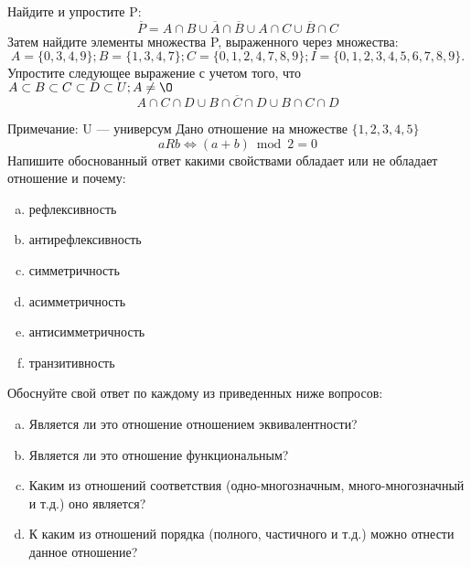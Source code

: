 \documentclass[10pt]{exam}
\begin{document}
\begin{questions}
\question
Найдите и упростите P:
\begin{equation*}
\overline{P} = A \cap B \cup \overline{A} \cap \overline{B} \cup A \cap C \cup \overline{B} \cap C
\end{equation*}
Затем найдите элементы множества P, выраженного через множества:
\begin{equation*}
A = \{0, 3, 4, 9\}; 
B = \{1, 3, 4, 7\};
C = \{0, 1, 2, 4, 7, 8, 9\};
I = \{0, 1, 2, 3, 4, 5, 6, 7, 8, 9\}.
\end{equation*}\question
Упростите следующее выражение с учетом того, что $A\subset B \subset C \subset D \subset U; A \neq \O$
\begin{equation*}
A \cap C  \cap D \cup B \cap \overline{C} \cap D \cup B \cap C \cap D
\end{equation*}

Примечание: U — универсум\question
Дано отношение на множестве $\{1, 2, 3, 4, 5\}$ 
\begin{equation*}
aRb \iff (a+b) \bmod 2 =0
\end{equation*}
Напишите обоснованный ответ какими свойствами обладает или не обладает отношение и почему:   
\begin{enumerate} [a)]\setcounter{enumi}{0}
\item рефлексивность
\item антирефлексивность
\item симметричность
\item асимметричность
\item антисимметричность
\item транзитивность
\end{enumerate}

Обоснуйте свой ответ по каждому из приведенных ниже вопросов:
\begin{enumerate} [a)]\setcounter{enumi}{0}
    \item Является ли это отношение отношением эквивалентности?
    \item Является ли это отношение функциональным?
    \item Каким из отношений соответствия (одно-многозначным, много-многозначный и т.д.) оно является?
    \item К каким из отношений порядка (полного, частичного и т.д.) можно отнести данное отношение?
\end{enumerate}




\end{questions}
\end{document}
